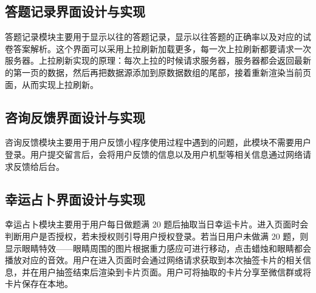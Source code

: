 \subsection{答题记录界面设计与实现}

答题记录模块主要用于显示以往的答题记录，显示以往答题的正确率以及对应的试卷答案解析。这个界面可以采用上拉刷新加载更多，每一次上拉刷新都要请求一次服务器。上拉刷新实现的原理：每次上拉的时候请求服务器，服务器都会返回最新的第一页的数据，然后再把数据源添加到原数据数组的尾部，接着重新渲染当前页面，从而实现上拉刷新。

\subsection{咨询反馈界面设计与实现}

咨询反馈模块主要用于用户反馈小程序使用过程中遇到的问题，此模块不需要用户登录。用户提交留言后，会将用户反馈的信息以及用户机型等相关信息通过网络请求反馈给后台。

\subsection{幸运占卜界面设计与实现}

幸运占卜模块主要用于用户每日做题满 20 题后抽取当日幸运卡片。进入页面时会判断用户是否授权，若未授权则引导用户授权登录。若当日用户未做满 20 题，则显示眼睛特效——眼睛周围的图片根据重力感应可进行移动，点击蜡烛和眼睛都会播放对应的音效。用户在进入页面时会通过网络请求获取到本次抽签卡片的相关信息，并在用户抽签结束后渲染到卡片页面。用户可将抽取的卡片分享至微信群或将卡片保存在本地\cite{bib:qie}。
